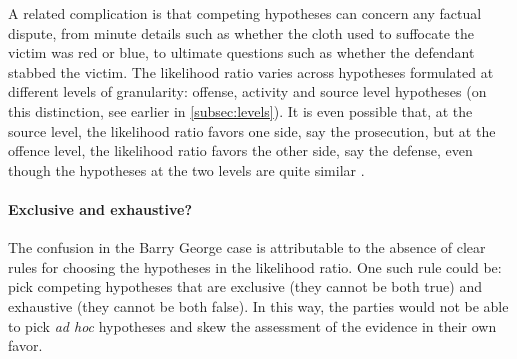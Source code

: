 \documentclass{article}
\begin{document}
 A related complication is that
competing hypotheses can concern any factual dispute, from minute details such as whether the cloth used to suffocate the victim was red or blue, to ultimate questions such as whether the defendant stabbed the victim.  The likelihood ratio varies across hypotheses formulated at different levels of granularity: offense, activity and source level hypotheses (on this distinction, see earlier in \ref{subsec:levels}). It is even possible that, at the source level, the likelihood ratio  favors one side, say the prosecution, but at the offence level, the likelihood ratio  favors the other side, say the defense, even though the hypotheses at the two levels are quite similar %
\citep{fenton2014WhenNeutralEvidence}.






\paragraph{Exclusive and exhaustive?}

The confusion in the Barry George case is attributable to the absence of clear rules for choosing the hypotheses in the likelihood ratio.
One such rule  could be: pick competing hypotheses that are exclusive (they cannot be both true) and exhaustive (they cannot be both false). In this way, the parties would not be able to pick  \textit{ad hoc} hypotheses and skew the assessment of the evidence in their own favor. 
%
\end{document}
